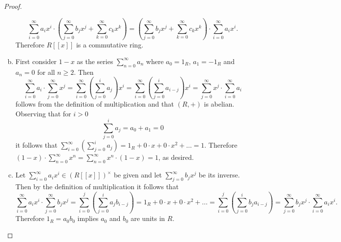\documentclass[10pt]{amsart}
\begin{document}
\begin{thm}
\begin{proof}
\begin{enumerate}[(a)]
      $$\sum_{i=0}^\infty a_ix^i \cdot \left(\sum_{j=0}^\infty b_jx^j + \sum_{k=0}^\infty c_kx^k \right) = \left(\sum_{j=0}^\infty b_jx^j + \sum_{k=0}^\infty c_kx^k \right) \cdot \sum_{i=0}^\infty a_ix^i.$$
      Therefore $R[[x]]$ is a commutative ring.
    \item
      First consider $1 - x$ as the series $\sum_{n=0}^\infty a_n$ where $a_0 = 1_R$, $a_1 = -1_R$ and $a_n = 0$ for all $n \geq 2$.
      Then 
      $$\sum_{i=0}^\infty a_i \cdot \sum_{j = 0}^\infty x^j = \sum_{i=0}^\infty\left(\sum_{j=0}^i a_j\right)x^i = \sum_{i=0}^\infty\left(\sum_{j=0}^i a_{i-j}\right)x^i = \sum_{j = 0}^\infty x^j \cdot \sum_{i=0}^\infty a_i$$
       follows from the definition of multiplication and that $(R, +)$ is abelian.
      Observing that for $i > 0$
      \begin{equation*}
        \sum_{j=0}^i a_j = a_0 + a_1 = 0
      \end{equation*}
      it follows that $\sum_{i=0}^\infty\left(\sum_{j=0}^i a_j\right) = 1_R + 0\cdot x + 0 \cdot x^2 + \ldots = 1$.
      Therefore $(1 - x) \cdot \sum_{n = 0}^\infty x^n = \sum_{n = 0}^\infty x^n \cdot (1 - x) = 1$, as desired.
    \item
      Let $\sum_{i=0}^\infty a_ix^i \in (R[[x]])^\times$ be given and let $\sum_{j=0}^\infty b_jx^j$ be its inverse.
      Then by the definition of multiplication it follows that
      $$\sum_{i=0}^\infty a_ix^i \cdot \sum_{j=0}^\infty b_jx^j = \sum_{i=0}^j\left(\sum_{j=0}^i a_jb_{i-j}\right) = 1_R + 0\cdot x + 0\cdot x^2 + \ldots = \sum_{i=0}^j\left(\sum_{j=0}^i b_j a_{i-j}\right) = \sum_{j=0}^\infty b_jx^j \cdot \sum_{i=0}^\infty a_ix^i.$$
      Therefore $1_R = a_0b_0$ implies $a_0$ and $b_0$ are units in $R$.
      

\end{enumerate}
\end{proof}
\end{thm}
\end{document}
